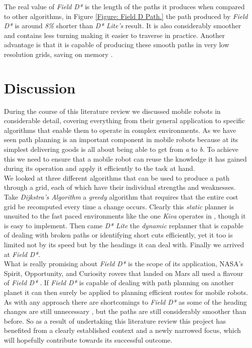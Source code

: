 \noindent
The real value of \textit{Field D*} is the length of the paths it produces when compared to other algorithms, in Figure \ref{Figure: Field D Path.} the path produced by \textit{Field D*} is around \textit{8\%} shorter than \textit{D* Lite's} result. It is also considerably smoother and contains less turning making it easier to traverse in practice. Another advantage is that it is capable of producing these smooth paths in very low resolution grids, saving on memory \cite{FIELD}.


\newpage

\section{Discussion}
During the course of this literature review we discussed mobile robots in considerable detail, covering everything from their general application to specific algorithms that enable them to operate in complex environments. As we have seen path planning is an important component in mobile robots because at its simplest delivering goods is all about being able to get from \textit{a} to \textit{b}. To achieve this we need to ensure that a mobile robot can reuse the knowledge it has gained during its operation and apply it efficiently to the task at hand.\\

\noindent
We looked at three different algorithms that can be used to produce a path through a grid, each of which have their individual strengths and weaknesses. Take \textit{Dijkstra's Algorithm} a \textit{greedy} algorithm that requires that the entire cost grid be recomputed every time a change occurs. Clearly this \textit{static} planner is unsuited to the fast paced environments like the one \textit{Kiva} operates in \cite{AZK12}, though it is easy to implement. Then came \textit{D* Lite} the \textit{dynamic} replanner that is capable of dealing with broken paths or identifying short cuts efficiently, yet it too is limited not by its speed but by the headings it can deal with. Finally we arrived at \textit{Field D*}.\\

\noindent
What is really promising about \textit{Field D*} is the scope of its application, NASA's Spirit, Opportunity, and Curiosity rovers that landed on Mars all used a flavour of \textit{Field D*} \cite{MARS}. If \textit{Field D*} is capable of dealing with path planning on another planet it can then surely be applied to planning efficient routes for mobile robots. As with any approach there are shortcomings to \textit{Field D*} as some of the heading changes are still unnecessary \cite{THETA*}, but the paths are still considerably smoother than before. So as a result of undertaking this literature review this project has benefited from a clearly established context and a newly narrowed focus, which will hopefully contribute towards its successful outcome.


\newpage


